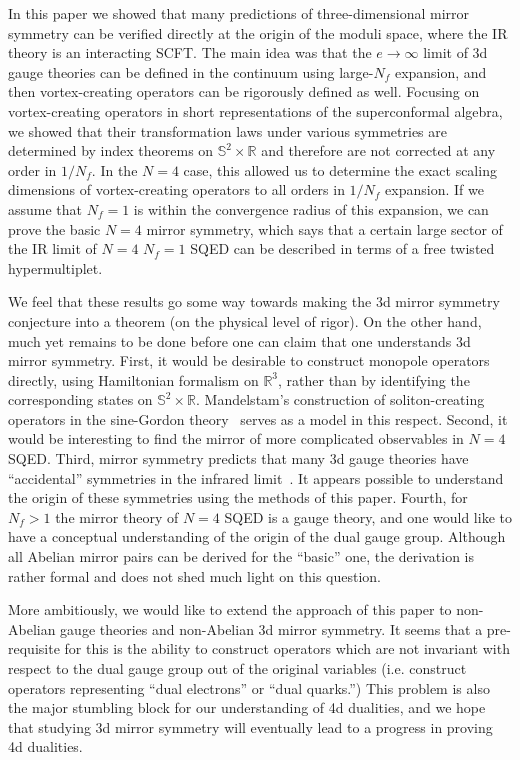 \documentclass[a4paper,12pt, amsfonts, amssymb]{article}
\newcommand{\RR}{{\mathbb R}}
\renewcommand{\SS}{{\mathbb S}}
\newcommand{\ra}{\rightarrow}
\begin{document}
In this paper we showed that many predictions of three-dimensional
mirror symmetry can be verified directly at the origin of the moduli
space, where the IR theory is an interacting SCFT. The main idea was that
the $e\ra\infty$ limit of 3d gauge theories can be defined in the
continuum using large-$N_f$ expansion, and then vortex-creating operators
can be rigorously defined as well. Focusing on vortex-creating operators
in short representations of the superconformal algebra, we showed that
their transformation laws under various symmetries are determined by
index theorems on $\SS^2\times\RR$ and therefore are not corrected at
any order in $1/N_f.$ In the $N=4$ case, this allowed us to determine
the exact scaling dimensions of vortex-creating operators to all orders
in $1/N_f$ expansion. If we assume that $N_f=1$ is within the convergence
radius of this expansion, we can prove the basic $N=4$ mirror symmetry,
which says that a certain large sector of the IR limit of $N=4$ $N_f=1$
SQED can be described in terms of a free twisted hypermultiplet.

We feel that these results go some way towards making the 3d mirror symmetry
conjecture into a theorem (on the physical level of rigor). 
On the other hand, much yet remains to be
done before one can claim that one understands 3d mirror symmetry.
First, it would be desirable to construct monopole operators
directly, using Hamiltonian formalism on $\RR^3$, rather than by
identifying the corresponding states on $\SS^2\times\RR.$ Mandelstam's
construction of soliton-creating operators in the sine-Gordon 
theory~\cite{Mandelstam} serves as a model in this respect. Second,
it would be interesting to find the mirror of more
complicated observables in $N=4$ SQED. Third, mirror symmetry predicts
that many 3d gauge theories have ``accidental'' symmetries in the infrared
limit~\cite{IS,Kapustin}. It appears possible to understand the origin of 
these symmetries using the methods of this paper.
Fourth, for $N_f>1$ the mirror theory of $N=4$ SQED is a gauge theory,
and one would like to have a conceptual understanding
of the origin of the dual gauge group. Although all Abelian mirror pairs
can be derived for the ``basic'' one, the derivation
is rather formal and does not shed much light on this question. 

More ambitiously, we would like to extend the approach of this paper to
non-Abelian gauge theories and non-Abelian 3d mirror symmetry. It seems
that a pre-requisite for this is the ability to construct 
operators which are not invariant with respect to the dual gauge group
out of the original variables (i.e. construct operators representing
``dual electrons'' or ``dual quarks.'') This problem is also
the major stumbling block for our understanding of 4d dualities, and we
hope that studying 3d mirror symmetry will eventually lead to a progress
in proving 4d dualities.
\end{document}
